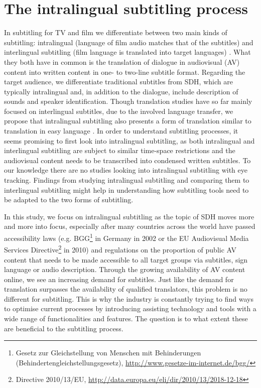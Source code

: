 \documentclass[output=paper]{langscibook}
\begin{document}
\section{The intralingual subtitling process} \label{sec:tardel:2}
In subtitling for TV and film we differentiate between two main kinds of subtitling: intralingual (language of film audio matches that of the subtitles) and interlingual subtitling (film language is translated into target languages) \citep{cintas2003audiovisual}.
What they both have in common is the translation of dialogue in audiovisual (AV) content into written content in one- to two-line subtitle format.
Regarding the target audience, we differentiate traditional subtitles from SDH, which are typically intralingual and, in addition to the dialogue, include description of sounds and speaker identification.
Though translation studies have so far mainly focused on interlingual subtitles, due to the involved language transfer, we propose that intralingual subtitling also presents a form of translation similar to translation in easy language \citep{HansenSchirraMaass}.
In order to understand subtitling processes, it seems promising to first look into intralingual subtitling, as both intralingual and interlingual subtitling are subject to similar time-space restrictions and the audiovisual content needs to be transcribed into condensed written subtitles.
To our knowledge there are no studies looking into intralingual subtitling with eye tracking.
Findings from studying intralingual subtitling and comparing them to interlingual subtitling might help in understanding how subtitling tools need to be adapted to the two forms of subtitling.

In this study, we focus on intralingual subtitling as the topic of SDH moves more and more into focus, especially after many countries across the world have passed accessibility laws (e.g.
BGG\footnote{Gesetz zur Gleichstellung von Menschen mit Behinderungen (Behindertengleichstellungsgesetz), \url{http://www.gesetze-im-internet.de/bgg/}} in Germany in 2002 or the EU Audiovisual Media Services Directive\footnote{Directive 2010/13/EU, \url{http://data.europa.eu/eli/dir/2010/13/2018-12-18}} in 2010) and regulations on the proportion of public AV content that needs to be made accessible to all target groups via subtitles, sign language or audio description.
Through the growing availability of AV content online, we see an increasing demand for subtitles. Just like the demand for translation surpasses the availability of qualified translators, this problem is no different for subtitling.
This is why the industry is constantly trying to find ways to optimise current processes by introducing assisting technology and tools with a wide range of functionalities and features.
The question is to what extent these are beneficial to the subtitling process.
\end{document}
